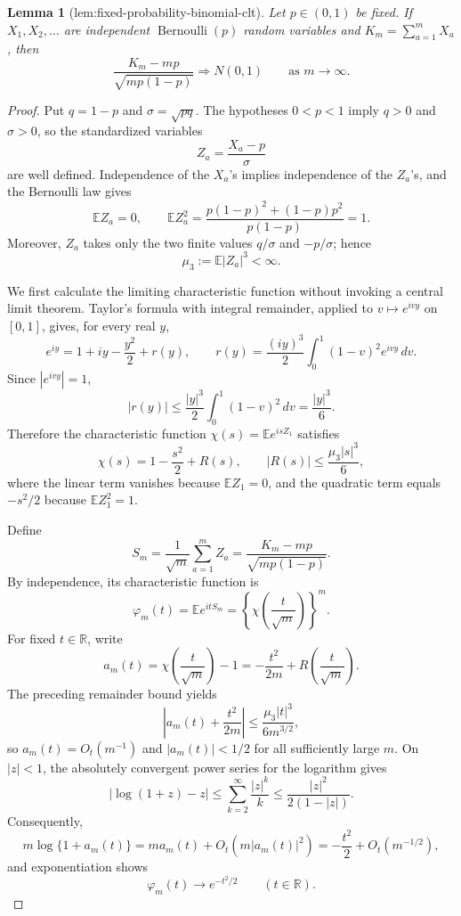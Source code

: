 \documentclass{article}
\newtheorem{lemma}{Lemma}
\begin{document}
\begin{lemma}[lem:fixed-probability-binomial-clt]\label{lem:fixed-probability-binomial-clt}
Let \(p\in(0,1)\) be fixed. If \(X_1,X_2,\ldots\) are independent \(\operatorname{Bernoulli}(p)\) random variables and \(K_m=\sum_{a=1}^mX_a\), then
\[
 \frac{K_m-mp}{\sqrt{mp(1-p)}}\Rightarrow N(0,1)
 \qquad\text{as }m\to\infty.
\]
\end{lemma}
\begin{proof}
Put \(q=1-p\) and \(\sigma=\sqrt{pq}\).  The hypotheses \(0<p<1\) imply \(q>0\) and \(\sigma>0\), so the standardized variables
\[
 Z_a=\frac{X_a-p}{\sigma}
\]
are well defined.  Independence of the \(X_a\)'s implies independence of the \(Z_a\)'s, and the Bernoulli law gives
\[
 \mathbb E Z_a=0,
 \qquad
 \mathbb E Z_a^2
 =\frac{p(1-p)^2+(1-p)p^2}{p(1-p)}=1.
\]
Moreover, \(Z_a\) takes only the two finite values \(q/\sigma\) and \(-p/\sigma\); hence
\[
 \mu_3:=\mathbb E|Z_a|^3<\infty.
\]

We first calculate the limiting characteristic function without invoking a central limit theorem.  Taylor's formula with integral remainder, applied to \(v\mapsto e^{ivy}\) on \([0,1]\), gives, for every real \(y\),
\[
 e^{iy}=1+iy-\frac{y^2}{2}+r(y),
 \qquad
 r(y)=\frac{(iy)^3}{2}\int_0^1(1-v)^2e^{ivy}\,dv.
\]
Since \(|e^{ivy}|=1\),
\[
 |r(y)|\leq \frac{|y|^3}{2}\int_0^1(1-v)^2\,dv
 =\frac{|y|^3}{6}.
\]
Therefore the characteristic function \(\chi(s)=\mathbb E e^{isZ_1}\) satisfies
\[
 \chi(s)=1-\frac{s^2}{2}+R(s),
 \qquad
 |R(s)|\leq \frac{\mu_3|s|^3}{6},
\]
where the linear term vanishes because \(\mathbb E Z_1=0\), and the quadratic term equals \(-s^2/2\) because \(\mathbb E Z_1^2=1\).

Define
\[
 S_m=\frac{1}{\sqrt m}\sum_{a=1}^m Z_a
 =\frac{K_m-mp}{\sqrt{mp(1-p)}}.
\]
By independence, its characteristic function is
\[
 \varphi_m(t)=\mathbb E e^{itS_m}
 =\left\{\chi\!\left(\frac{t}{\sqrt m}\right)\right\}^{m}.
\]
For fixed \(t\in\mathbb R\), write
\[
 a_m(t)=\chi\!\left(\frac{t}{\sqrt m}\right)-1
 =-\frac{t^2}{2m}+R\!\left(\frac{t}{\sqrt m}\right).
\]
The preceding remainder bound yields
\[
 \left|a_m(t)+\frac{t^2}{2m}\right|
 \leq \frac{\mu_3|t|^3}{6m^{3/2}},
\]
so \(a_m(t)=O_t(m^{-1})\) and \(|a_m(t)|<1/2\) for all sufficiently large \(m\).  On \(|z|<1\), the absolutely convergent power series for the logarithm gives
\[
 \left|\log(1+z)-z\right|
 \leq \sum_{k=2}^{\infty}\frac{|z|^k}{k}
 \leq \frac{|z|^2}{2(1-|z|)}.
\]
Consequently,
\[
 m\log\{1+a_m(t)\}
 =m a_m(t)+O_t\!\left(m|a_m(t)|^2\right)
 =-\frac{t^2}{2}+O_t(m^{-1/2}),
\]
and exponentiation shows
\[
 \varphi_m(t)\longrightarrow e^{-t^2/2}
 \qquad (t\in\mathbb R).
\]


\end{proof}
\end{document}

